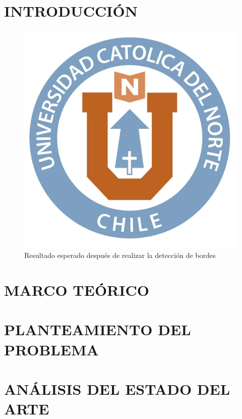 \documentclass[oneside,12pt, letterpaper, titlepage]{book}
\begin{document}
\chapter[INTRODUCCIÓN]{INTRODUCCIÓN}


\begin{figure}[H]
\centering
\includegraphics[scale = 0.7]{images/u.jpg}
\caption{Resultado esperado después de realizar la detección de bordes}
\label{fig:resultado}
\end{figure}




\chapter[MARCO TEÓRICO]{MARCO TEÓRICO}
\label{chapter:marco_teorico}


\chapter[PLANTEAMIENTO DEL PROBLEMA]{PLANTEAMIENTO DEL PROBLEMA}


\chapter[ANÁLISIS DEL ESTADO DEL ARTE]{ANÁLISIS DEL ESTADO DEL ARTE}
\end{document}
